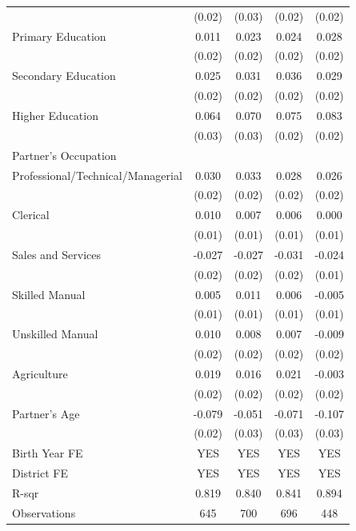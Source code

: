 \begin{longtable}{l*{4}{c}}
                    & (0.02) & (0.03) & (0.02) & (0.02) \\
\hspace{1em}Primary Education & 0.011 & 0.023 & 0.024 & 0.028 \\
                    & (0.02) & (0.02) & (0.02) & (0.02) \\
\hspace{1em}Secondary Education & 0.025 & 0.031 & 0.036\sym{*} & 0.029 \\
                    & (0.02) & (0.02) & (0.02) & (0.02) \\
\hspace{1em}Higher Education & 0.064\sym{**} & 0.070\sym{***} & 0.075\sym{***} & 0.083\sym{***} \\
                    & (0.03) & (0.03) & (0.02) & (0.02) \\
\multicolumn{5}{l}{Partner's Occupation} \\
\hspace{1em}Professional/Technical/Managerial & 0.030 & 0.033 & 0.028 & 0.026 \\
                    & (0.02) & (0.02) & (0.02) & (0.02) \\
\hspace{1em}Clerical & 0.010 & 0.007 & 0.006 & 0.000 \\
                    & (0.01) & (0.01) & (0.01) & (0.01) \\
\hspace{1em}Sales and Services & -0.027\sym{*} & -0.027\sym{*} & -0.031\sym{**} & -0.024\sym{*} \\
                    & (0.02) & (0.02) & (0.02) & (0.01) \\
\hspace{1em}Skilled Manual & 0.005 & 0.011 & 0.006 & -0.005 \\
                    & (0.01) & (0.01) & (0.01) & (0.01) \\
\hspace{1em}Unskilled Manual & 0.010 & 0.008 & 0.007 & -0.009 \\
                    & (0.02) & (0.02) & (0.02) & (0.02) \\
\hspace{1em}Agriculture & 0.019 & 0.016 & 0.021 & -0.003 \\
                    & (0.02) & (0.02) & (0.02) & (0.02) \\
Partner's Age & -0.079\sym{***} & -0.051 & -0.071\sym{**} & -0.107\sym{***} \\
                    & (0.02) & (0.03) & (0.03) & (0.03) \\
\hline
Birth Year FE & YES & YES & YES & YES \\
District FE & YES & YES & YES & YES \\
R-sqr & 0.819 & 0.840 & 0.841 & 0.894 \\
Observations & 645 & 700 & 696 & 448 \\
\hline \hline

\end{longtable}